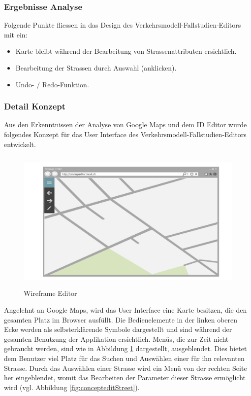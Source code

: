 \subsubsection*{Ergebnisse Analyse}
Folgende Punkte fliessen in das Design des Verkehrsmodell-Fallstudien-Editors mit ein:
\begin{itemize}
\itemsep0em
\item Karte bleibt während der Bearbeitung von Strassenattributen ersichtlich.
\item Bearbeitung der Strassen durch Auswahl (anklicken).
\item Undo- / Redo-Funktion.
\end{itemize}
\newpage
\subsubsection{Detail Konzept}\label{sec:detailuiconcept}
Aus den Erkenntnissen der Analyse von Google Maps und dem ID Editor wurde folgendes Konzept für das User Interface des Verkehrsmodell-Fallstudien-Editors entwickelt.
\begin{figure}[H]
\centering
\includegraphics[height=7cm]{images/KonzeptUI.PNG}
\caption{Wireframe Editor}
\label{fig:conceptui}
\end{figure}
\noindent
Angelehnt an Google Maps, wird das User Interface eine Karte besitzen, die den gesamten Platz im Browser ausfüllt. Die Bedienelemente in der linken oberen Ecke werden als selbsterklärende Symbole dargestellt und sind während der gesamten Benutzung der Applikation ersichtlich. Menüs, die zur Zeit nicht gebraucht werden, sind wie in Abbildung \ref{fig:conceptui} dargestellt, ausgeblendet. Dies bietet dem Benutzer viel Platz für das Suchen und Auswählen einer für ihn relevanten Strasse. Durch das Auswählen einer Strasse wird ein Menü von der rechten Seite her eingeblendet, womit das Bearbeiten der Parameter dieser Strasse ermöglicht wird (vgl. Abbildung \ref{fig:concepteditStreet}).
